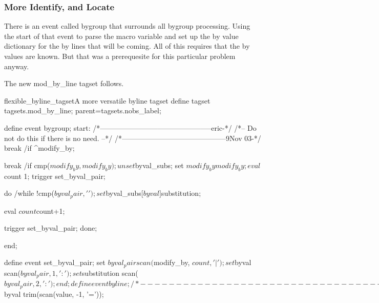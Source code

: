 \subsubsection{More Identify, and Locate}
There is an event called bygroup that surrounds all bygroup processing.  Using the start
of that event to parse the macro variable and set up the by value dictionary for the by lines
that will be coming. All of this requires that the by values are known.  But that
was a prerequesite for this particular problem anyway.

The new mod\_by\_line tagset follows.

\begin{fvcode}{flexible_byline_tagset}{A more versatile byline tagset}
 define tagset tagsets.mod_by_line;
        parent=tagsets.nobs_label;
        
        define event bygroup;
            start:
                /*-----------------------------------------------eric-*/
                /*-- Do not do this if there is no need.            --*/
                /*--------------------------------------------9Nov 03-*/
                break /if ^modify_by;

                break /if cmp($modify_by, modify_by);
                
                unset $byval_subs;
                set $modify_by modify_by;
                
                eval $count 1;
                trigger set_byval_pair;

                do /while !cmp($byval_pair, ' ');

                    set $byval_subs[$byval] $substitution;

                    eval $count $count+1;

                    trigger set_byval_pair;
                done;

        end;

        define event set_byval_pair;     
            set $byval_pair scan($modify_by, $count, '|');
            set $byval scan($byval_pair, 1, ':');
            set $substitution scan($byval_pair, 2, ':');
        end;   
        

        define event byline;
            /*---------------------------------------------------eric-*/
            /*-- Get the by value in string form                    --*/
            /*------------------------------------------------7Aug 03-*/
            eval $byval trim(scan(value, -1, '='));
            

\end{fvcode}
